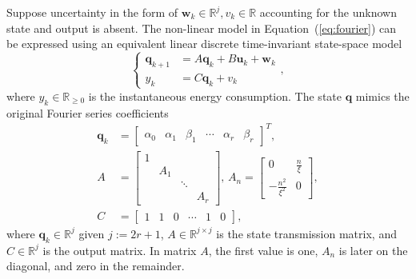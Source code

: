 \documentclass[letterpaper,10pt,conference]{ieeeconf}
\theoremstyle{definition}
\begin{document}
Suppose uncertainty in the form of $\mathbf{w}_k\in\mathbb{R}^j,v_k\in\mathbb{R}$ accounting for the unknown state and output is absent. The non-linear model in Equation~(\ref{eq:fourier}) can be expressed using an equivalent linear discrete time-invariant state-space model
\begin{equation}\label{eq:state-perf}\begin{cases}
  \mathbf{q}_{k+1}&=A\mathbf{q}_{k}+B\mathbf{u}_{k}+\mathbf{w}_k\\
  y_k&=C\mathbf{q}_k+v_k
\end{cases},\end{equation}
where $y_k\in\mathbb{R}_{\geq 0}$ is the instantaneous energy consumption. The state $\mathbf{q}$ mimics the original Fourier series coefficients
\begin{equation}\label{eq:state-details}\begin{split}
  \mathbf{q}_k&=\left[\begin{array}{cccccc}
    \alpha_0 & \alpha_1 & \beta_1 & \cdots & \alpha_r & \beta_r
  \end{array}\right]^T,\\
  A&=\left[\begin{array}{cccc}
    1&    &       &  \\
     & A_1&       &  \\
     &    & \ddots&  \\
     &    &       & A_r 
  \end{array}\right],\,A_n=\begin{bmatrix}0 & \frac{n}{\xi} \\ -\frac{n^2}{\xi^2} & 0\end{bmatrix},\\
  C&=\left[\begin{array}{cccccc}
    1 & 1 & 0 & \cdots & 1 & 0
  \end{array}\right],
\end{split}\end{equation}
where $\mathbf{q}_k\in\mathbb{R}^j$ given $j:=2r+1$, $A\in\mathbb{R}^{j\times j}$ is the state transmission matrix, and $C\in\mathbb{R}^j$ is the output matrix. In matrix $A$, the first value is one, $A_n$ is later on the diagonal, and zero in the remainder.
\end{document}
